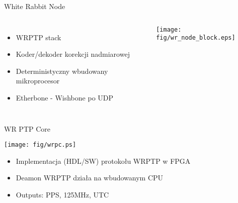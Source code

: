 \documentclass[compress,red]{beamer}
\begin{document}
\begin{frame}{White Rabbit Node}

  \begin{columns}[c]

  \begin{itemize}
    \item WRPTP stack
    \item Koder/dekoder korekcji nadmiarowej
    \item Deterministyczny wbudowany mikroprocesor
    \item Etherbone - Wishbone po UDP
  \end{itemize}



    \begin{center}
    \texttt{[image: fig/wr\_node\_block.eps]}
    \end{center}


  \end{columns}



\end{frame}
\begin{frame}{WR PTP Core}





    \begin{center}
    \texttt{[image: fig/wrpc.ps]}
    \end{center}

  \begin{itemize}
    \item Implementacja (HDL/SW) protokołu WRPTP w FPGA
    \item Deamon WRPTP działa na wbudowanym CPU
    \item Outputs: PPS, 125MHz, UTC
  \end{itemize}






\end{frame}
\end{document}
